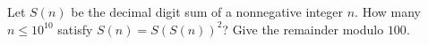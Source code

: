 Let $S(n)$ be the decimal digit sum of a nonnegative integer $n$. How many $n\le10^{10}$ satisfy $S(n)=S(S(n))^2$? Give the remainder modulo $100$.
